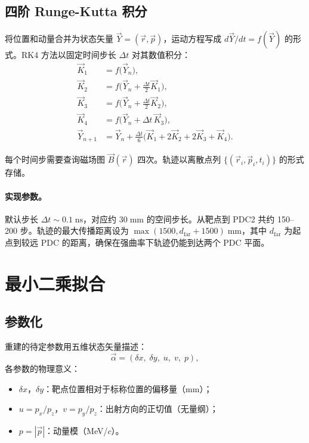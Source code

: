 \documentclass[a4paper, 11pt]{article}
\begin{document}
\subsection{四阶 Runge-Kutta 积分}

将位置和动量合并为状态矢量 $\vec{Y} = (\vec{r}, \vec{p})$，运动方程写成 $d\vec{Y}/dt = f(\vec{Y})$ 的形式。RK4 方法以固定时间步长 $\Delta t$ 对其数值积分：
\begin{align}
  \vec{K}_1 &= f\bigl(\vec{Y}_n\bigr), \\
  \vec{K}_2 &= f\bigl(\vec{Y}_n + \tfrac{\Delta t}{2}\vec{K}_1\bigr), \\
  \vec{K}_3 &= f\bigl(\vec{Y}_n + \tfrac{\Delta t}{2}\vec{K}_2\bigr), \\
  \vec{K}_4 &= f\bigl(\vec{Y}_n + \Delta t\,\vec{K}_3\bigr), \\
  \vec{Y}_{n+1} &= \vec{Y}_n + \frac{\Delta t}{6}
  \bigl(\vec{K}_1 + 2\vec{K}_2 + 2\vec{K}_3 + \vec{K}_4\bigr).
  \label{eq:rk4}
\end{align}

每个时间步需要查询磁场图 $\vec{B}(\vec{r})$ 四次。轨迹以离散点列 $\{(\vec{r}_i, \vec{p}_i, t_i)\}$ 的形式存储。

\paragraph{实现参数。}
默认步长 $\Delta t \sim 0.1\;\mathrm{ns}$，对应约 $30\;\mathrm{mm}$ 的空间步长。从靶点到 PDC2 共约 150--200 步。轨迹的最大传播距离设为 $\max(1500, d_\mathrm{far} + 1500)\;\mathrm{mm}$，其中 $d_\mathrm{far}$ 为起点到较远 PDC 的距离，确保在强曲率下轨迹仍能到达两个 PDC 平面。

\section{最小二乘拟合}

\subsection{参数化}

重建的待定参数用五维状态矢量描述：
\begin{equation}
  \vec{\alpha} = (\delta x,\; \delta y,\; u,\; v,\; p),
\end{equation}
各参数的物理意义：
\begin{itemize}[nosep]
  \item $\delta x$，$\delta y$：靶点位置相对于标称位置的偏移量（mm）；
  \item $u = p_x / p_z$，$v = p_y / p_z$：出射方向的正切值（无量纲）；
  \item $p = |\vec{p}|$：动量模（MeV/$c$）。
\end{itemize}
\end{document}
